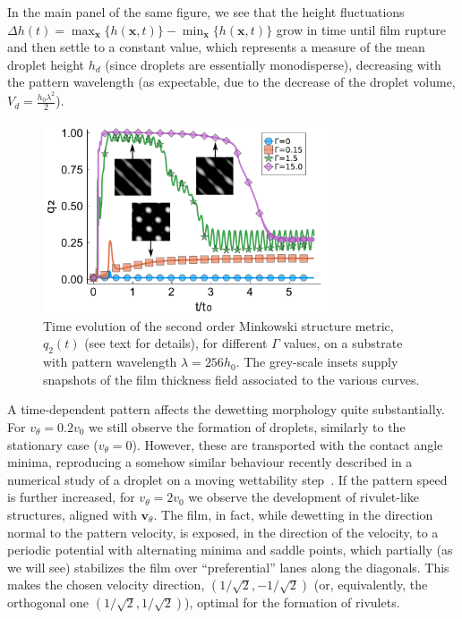 In the main panel of the same figure, we see that the height fluctuations $\Delta h(t) = \max_{\mathbf{x}}\{h(\mathbf{x},t)\}-\min_{\mathbf{x}}\{h(\mathbf{x},t)\}$ grow in time until film rupture and then settle to a constant value, which represents a measure of the mean droplet height $h_d$ (since
droplets are essentially monodisperse), decreasing with the pattern wavelength (as expectable, due to the decrease of the droplet volume, $V_d = \frac{h_0 \lambda^2}{2}$).\\
\begin{figure}
    \centering
    \includegraphics[width=0.75\textwidth]{graphics/Figure_4.pdf}
    \caption{Time evolution of the second order Minkowski structure metric, $q_2(t)$ (see text for details), for different $\Gamma$ values, on a substrate with pattern wavelength $\lambda=256 h_0$.
    The grey-scale insets supply snapshots of the film thickness field associated to the various curves.
    }
    \label{fig:msm_q2}
\end{figure}
A time-dependent pattern affects the dewetting morphology quite substantially.
For $v_{\theta} = 0.2 v_0$ we still observe the formation of droplets, similarly to the stationary case ($v_{\theta} = 0$). 
However, these are transported with the contact angle minima, reproducing a somehow similar behaviour recently described in a numerical study of a droplet on a moving wettability step~\cite{grawitterSteeringDropletsSubstrates2021}.
If the pattern speed is further increased, for $v_{\theta} = 2 v_0$ we observe the development of rivulet-like structures, aligned with $\mathbf{v}_{\theta}$. 
The film, in fact, while dewetting in the direction normal to the pattern velocity, is exposed, in the direction of the velocity, to a periodic potential with alternating minima and saddle points, which partially (as we will see) stabilizes the film over ``preferential'' lanes along the diagonals. 
This makes the chosen velocity direction, $(1/\sqrt{2},-1/\sqrt{2})$ (or, equivalently, the orthogonal one $(1/\sqrt{2},1/\sqrt{2})$), optimal for the formation of rivulets. 

